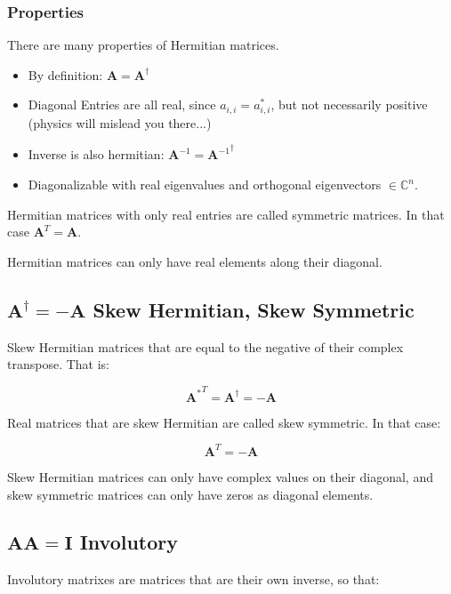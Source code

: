 \subsubsection{Properties}
There are many properties of Hermitian matrices. 
\begin{itemize}
\item By definition: $\mathbf{A} = \mathbf{A}^\dagger$
\item Diagonal Entries are all real, since $a_{i,i} = a_{i,i}^*$, but not necessarily positive (physics will mislead you there...)
\item Inverse is also hermitian:  $\mathbf{A}^{-1} ={ \mathbf{A}^{-1}}^\dagger$
\item Diagonalizable with real eigenvalues and orthogonal eigenvectors $\in \mathbb{C}^n$.
\end{itemize}


Hermitian matrices with only real entries are called symmetric matrices. In that case $\mathbf{A}^T = \mathbf{A}$.

Hermitian matrices can only have real elements along their diagonal. 



\subsection{$\mathbf{A}^{\dagger} = -\mathbf{A}$ Skew Hermitian, Skew Symmetric}
Skew Hermitian matrices that are equal to the negative of their complex transpose. That is:

\begin{equation}
{\mathbf{A}^{*}}^T = \mathbf{A}^\dagger = -\mathbf{A} 
\end{equation}

Real matrices that are skew Hermitian are called skew symmetric. In that case:

\begin{equation}
\mathbf{A}^T = -\mathbf{A} 
\end{equation}


Skew Hermitian matrices can only have complex values on their diagonal, and skew symmetric matrices can only have zeros as diagonal elements.




\subsection{$\mathbf{A}\mathbf{A}=\mathbf{I}$ Involutory}
Involutory matrixes are matrices that are their own inverse, so that:

